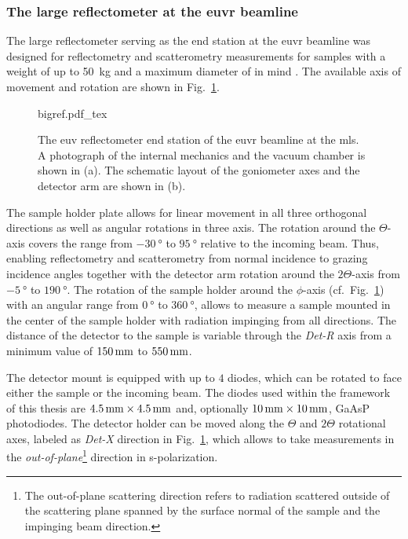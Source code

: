 \subsubsection{The large reflectometer at the \gls{euvr} beamline}
The large reflectometer serving as the end station at the \gls{euvr} beamline was designed for reflectometry and scatterometry measurements for samples with a weight of up to \SI{50}{\kg} and a maximum diameter of  in mind \cite{tummler_characterization_2003}. The available axis of movement and rotation are shown in Fig.~\ref{ch_exp:fig_bigref}.
\begin{figure}[htb]
    \def\svgwidth{\textwidth}
    {bigref.pdf_tex}
    \caption[The EUV reflectometer end station of the EUVR beamline.]{The \gls{euv} reflectometer end station of the \gls{euvr} beamline at the \gls{mls}. A photograph of the internal mechanics and the vacuum chamber is shown in (a). The schematic layout of the goniometer axes and the detector arm are shown in (b).}
    \label{ch_exp:fig_bigref}
\end{figure}
The sample holder plate allows for linear movement in all three orthogonal directions as well as angular rotations in three axis. The rotation around the $\Theta$-axis covers the range from $\SI{-30}{\degree}$ to $\SI{95}{\degree}$ relative to the incoming beam. Thus, enabling reflectometry and scatterometry from normal incidence to grazing incidence angles together with the detector arm rotation around the $2\Theta$-axis from $\SI{-5}{\degree}$ to $\SI{190}{\degree}$. The rotation of the sample holder around the $\phi$-axis (cf.~Fig.~\ref{ch_exp:fig_bigref}) with an angular range from $\SI{0}{\degree}$ to $\SI{360}{\degree}$, allows to measure a sample mounted in the center of the sample holder with radiation impinging from all directions. The distance of the detector to the sample is variable through the \emph{Det-R} axis from a minimum value of $\mm{150}$ to $\mm{550}$.

The detector mount is equipped with up to $4$ diodes, which can be rotated to face either the sample or the incoming beam. The diodes used within the framework of this thesis are $\mm{4.5} \times \mm{4.5}$ and, optionally $\mm{10} \times \mm{10}$, GaAsP photodiodes. The detector holder can be moved along the $\Theta$ and $2\Theta$ rotational axes, labeled as \emph{Det-X} direction in Fig.~\ref{ch_exp:fig_bigref}, which allows to take measurements in the \emph{out-of-plane}\footnote{The out-of-plane scattering direction refers to radiation scattered outside of the scattering plane spanned by the surface normal of the sample and the impinging beam direction.} direction in s-polarization.

